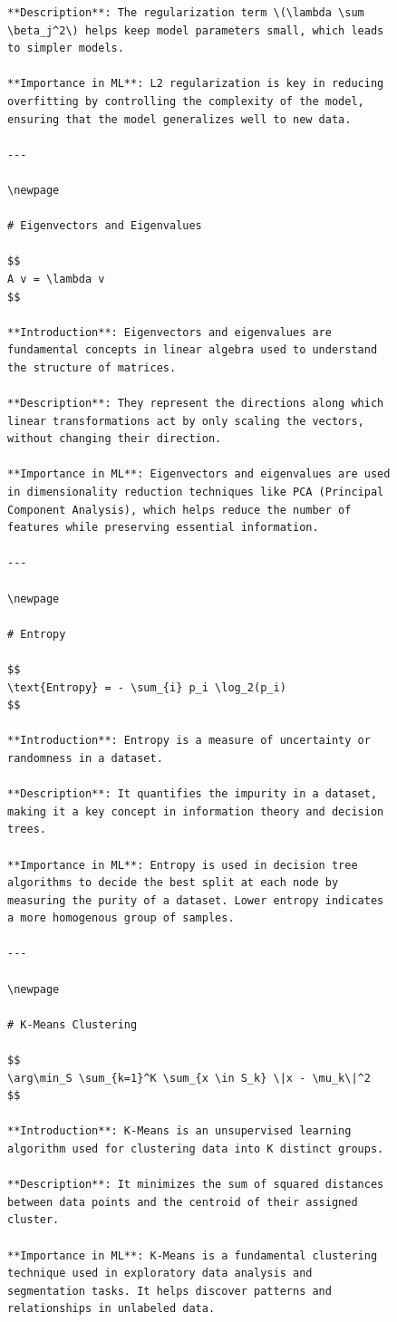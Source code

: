 \documentclass[
  12 pt,
  a4paper,
]{book}
\numberwithin{equation}{section}
\theoremstyle{plain}      %
\theoremstyle{definition} %
\theoremstyle{remark}     %
\theoremstyle{note}         %
\begin{document}
\begin{figure}
\begin{verbatim}
**Description**: The regularization term \(\lambda \sum \beta_j^2\) helps keep model parameters small, which leads to simpler models.

**Importance in ML**: L2 regularization is key in reducing overfitting by controlling the complexity of the model, ensuring that the model generalizes well to new data.

---

\newpage

# Eigenvectors and Eigenvalues

$$
A v = \lambda v
$$

**Introduction**: Eigenvectors and eigenvalues are fundamental concepts in linear algebra used to understand the structure of matrices.

**Description**: They represent the directions along which linear transformations act by only scaling the vectors, without changing their direction.

**Importance in ML**: Eigenvectors and eigenvalues are used in dimensionality reduction techniques like PCA (Principal Component Analysis), which helps reduce the number of features while preserving essential information.

---

\newpage

# Entropy

$$
\text{Entropy} = - \sum_{i} p_i \log_2(p_i)
$$

**Introduction**: Entropy is a measure of uncertainty or randomness in a dataset.

**Description**: It quantifies the impurity in a dataset, making it a key concept in information theory and decision trees.

**Importance in ML**: Entropy is used in decision tree algorithms to decide the best split at each node by measuring the purity of a dataset. Lower entropy indicates a more homogenous group of samples.

---

\newpage

# K-Means Clustering

$$
\arg\min_S \sum_{k=1}^K \sum_{x \in S_k} \|x - \mu_k\|^2
$$

**Introduction**: K-Means is an unsupervised learning algorithm used for clustering data into K distinct groups.

**Description**: It minimizes the sum of squared distances between data points and the centroid of their assigned cluster.

**Importance in ML**: K-Means is a fundamental clustering technique used in exploratory data analysis and segmentation tasks. It helps discover patterns and relationships in unlabeled data.


\end{verbatim}
\end{figure}
\end{document}
